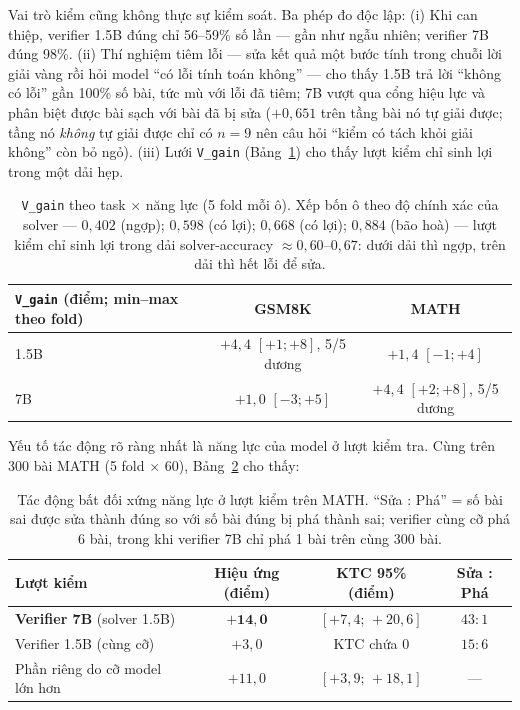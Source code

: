 \documentclass[11pt,a4paper]{article}
\begin{document}
Vai trò kiểm cũng không thực sự kiểm soát. Ba phép đo độc lập: (i) Khi can thiệp, verifier 1.5B đúng chỉ 56--59\% số lần --- gần như ngẫu nhiên; verifier 7B đúng 98\%. (ii) Thí nghiệm tiêm lỗi --- sửa kết quả một bước tính trong chuỗi lời giải vàng rồi hỏi model ``có lỗi tính toán không'' --- cho thấy 1.5B trả lời ``không có lỗi'' gần 100\% số bài, tức mù với lỗi đã tiêm; 7B vượt qua cổng hiệu lực và phân biệt được bài sạch với bài đã bị sửa ($+0{,}651$ trên tầng bài nó tự giải được; tầng nó \emph{không} tự giải được chỉ có $n=9$ nên câu hỏi ``kiểm có tách khỏi giải không'' còn bỏ ngỏ). (iii) Lưới \texttt{V\_gain} (Bảng~\ref{tab:vgaingrid}) cho thấy lượt kiểm chỉ sinh lợi trong một dải hẹp.

\begin{table}[h]\centering\small
\begin{tabular}{@{}l c c@{}}
\toprule
\texttt{V\_gain} (điểm; min--max theo fold) & GSM8K & MATH\\
\midrule
1.5B & $+4{,}4$ $[+1;+8]$, 5/5 dương & $+1{,}4$ $[-1;+4]$\\
7B   & $+1{,}0$ $[-3;+5]$ & $+4{,}4$ $[+2;+8]$, 5/5 dương\\
\bottomrule
\end{tabular}
\caption{\texttt{V\_gain} theo task $\times$ năng lực (5 fold mỗi ô). Xếp bốn ô theo độ chính xác
của solver --- $0{,}402$ (ngợp); $0{,}598$ (có lợi); $0{,}668$ (có lợi); $0{,}884$ (bão hoà) --- lượt
kiểm chỉ sinh lợi trong dải solver-accuracy $\approx 0{,}60$--$0{,}67$: dưới dải thì ngợp, trên dải
thì hết lỗi để sửa.}
\label{tab:vgaingrid}
\end{table}

Yếu tố tác động rõ ràng nhất là năng lực của model ở lượt kiểm tra. Cùng trên 300 bài MATH (5 fold $\times$ 60), Bảng~\ref{tab:verifier} cho thấy:

\begin{table}[h]\centering\small
\begin{tabular}{@{}l c c c@{}}
\toprule
Lượt kiểm & Hiệu ứng (điểm) & KTC 95\% (điểm) & Sửa : Phá\\
\midrule
\textbf{Verifier 7B} (solver 1.5B) & $\mathbf{+14{,}0}$ & $[+7{,}4;\,+20{,}6]$ & $43:1$\\
Verifier 1.5B (cùng cỡ) & $+3{,}0$ & KTC chứa 0 & $15:6$\\
Phần riêng do cỡ model lớn hơn & $+11{,}0$ & $[+3{,}9;\,+18{,}1]$ & ---\\
\bottomrule
\end{tabular}
\caption{Tác động bất đối xứng năng lực ở lượt kiểm trên MATH. ``Sửa : Phá'' = số bài sai được sửa thành đúng so với số bài đúng bị phá thành sai; verifier cùng cỡ phá 6 bài, trong khi verifier 7B chỉ phá 1 bài trên cùng 300 bài.}
\label{tab:verifier}
\end{table}
\end{document}
